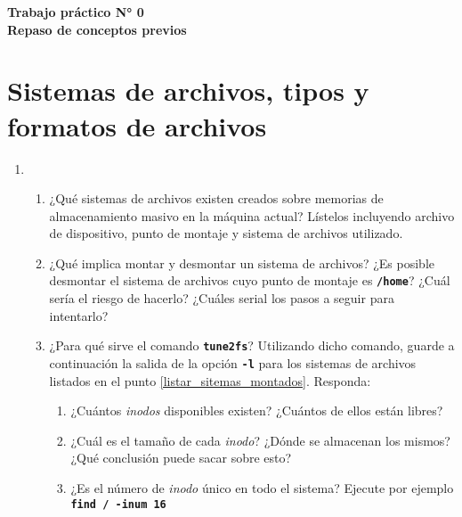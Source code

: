 \documentclass[12pt]{article}
\newcommand{\code}[1]{\textbf{\tt #1}}
\def\maketitle{

\makeatletter
{\color{bl} \centering \huge \sc \textbf{ Trabajo práctico N° 0\\ \large
\vspace*{-8pt} \color{black}Repaso de conceptos previos\vspace*{8pt} }\par}
\makeatother

\makeatletter

}
\begin{document}
\thispagestyle{empty}
\maketitle
\setlength{\parindent}{0pt}

\section*{Sistemas de archivos, tipos y formatos de archivos}

\begin{enumerate}

    \item \begin{enumerate}

        \item ¿Qué sistemas de archivos existen creados sobre memorias de
            almacenamiento masivo en la máquina actual? Lístelos incluyendo
            archivo de dispositivo, punto de montaje y sistema de archivos
            utilizado. \label{listar_sitemas_montados}

        \item   ¿Qué implica montar y desmontar un sistema de archivos? ¿Es
            posible desmontar el sistema de archivos cuyo punto de montaje es
            \code{/home}? ¿Cuál sería el riesgo de hacerlo? ¿Cuáles serial los
            pasos a seguir para intentarlo?

        \item ¿Para qué sirve el comando \code{tune2fs}? Utilizando dicho
            comando, guarde a continuación la salida de la opción \code{-l}
            para los sistemas de archivos listados en el punto
            \ref{listar_sitemas_montados}. Responda:

            \begin{enumerate}

                \item   ¿Cuántos \emph{inodos} disponibles existen? ¿Cuántos
                    de ellos están libres?

                \item   ¿Cuál es el tamaño de cada \emph{inodo}? ¿Dónde se
                    almacenan los mismos? ¿Qué conclusión puede sacar sobre
                    esto?

                \item   ¿Es el número de \emph{inodo} único en todo el
                    sistema? Ejecute por ejemplo \code{find / -inum 16}


\end{enumerate}
\end{enumerate}
\end{enumerate}
\end{document}
